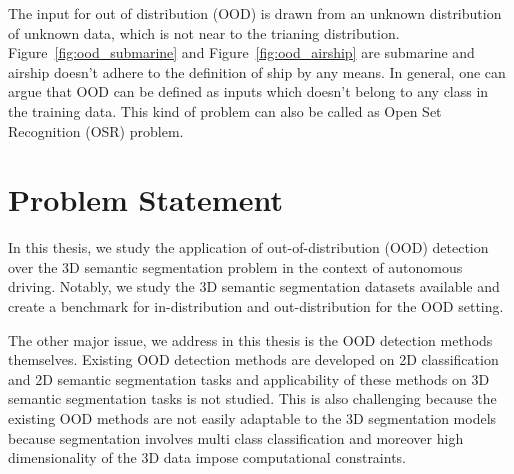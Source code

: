 The input for out of distribution (OOD) is drawn from an unknown distribution of unknown data, which is not near to the trianing distribution.
Figure~\ref{fig:ood_submarine} and Figure~\ref{fig:ood_airship} are submarine and airship doesn't adhere to the definition of ship by any means.
In general, one can argue that OOD can be defined as inputs which doesn't belong to any class in the training data.
This kind of problem can also be called as Open Set Recognition (OSR) problem.



\section{Problem Statement}
In this thesis, we study the application of out-of-distribution (OOD) detection over the 3D semantic segmentation problem in the context of autonomous driving.
Notably, we study the 3D semantic segmentation datasets available and create a benchmark for in-distribution and out-distribution for the OOD setting.

The other major issue, we address in this thesis is the OOD detection methods themselves.
Existing OOD detection methods are developed on 2D classification and 2D semantic segmentation tasks and applicability of these methods on 3D semantic segmentation tasks is not studied. 
This is also challenging because the existing OOD methods are not easily adaptable to the 3D segmentation models because segmentation involves multi class classification and moreover high dimensionality of the 3D data impose computational constraints.
\newline

